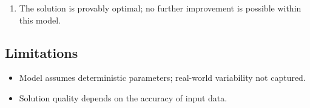 \documentclass[11pt, a4paper]{article}
\begin{document}
\begin{enumerate}
  \item The solution is provably optimal; no further improvement is possible within this model.
\end{enumerate}

\subsection{Limitations}

\begin{polyawarnbox}
\begin{itemize}
  \item Model assumes deterministic parameters; real-world variability not captured.
  \item Solution quality depends on the accuracy of input data.
\end{itemize}
\end{polyawarnbox}

\end{document}
